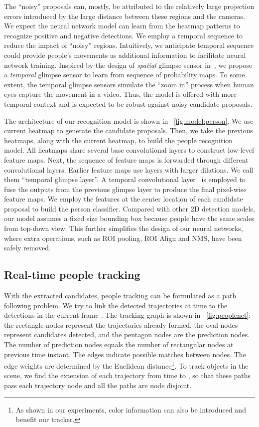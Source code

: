 \documentclass{article}
\begin{document}
The ``noisy'' proposals can, mostly, be attributed to the relatively large projection errors
introduced by the large distance between these regions and the cameras. We expect the neural network model can learn from the heatmap patterns to recognize positive and
negative detections.
We employ a temporal sequence to reduce the impact of ``noisy'' regions.
Intuitively, we anticipate temporal sequence could provide people's movements as additional information to facilitate neural network training.
Inspired by the design of \textit{spatial} glimpse sensor in~\cite{mnih2014recurrent}, we propose a \textit{temporal} glimpse sensor to learn from sequence of probability maps.
To some extent, the temporal glimpse sensors simulate the ``zoom in'' process when human eyes capture the movement in a video. Thus, the model is offered with
more temporal context and is expected to be robust against noisy candidate proposals.

The architecture of our recognition model is shown in \figurename~\ref{fig:model:person}. We use current heatmap  to generate the candidate proposals.
Then, we take the previous  heatmaps, along with the current heatmap, to build the people recognition model. All heatmaps share several base convolutional
layers to construct low-level feature maps. Next, the sequence of feature maps is forwarded through different convolutional layers.
Earlier feature maps use layers with larger dilations. We call them ``temporal glimpse layer''.
A temporal convolutional layer~\cite{bai2018empirical} is employed to fuse the outputs from the previous glimpse layer to produce the final pixel-wise feature maps.
We employ the features at the center location of each candidate proposal to build the person classifier. Compared with other 2D detection models,
our model assumes a fixed size bounding box because people have the same scales from top-down view. This further simplifies the design of our neural networks,
where extra operations, such as ROI pooling, ROI Align and NMS, have been safely removed.
\subsection{Real-time people tracking}
With the extracted candidates, people tracking can be formulated as a path following problem.
We try to link the detected trajectories at time  to the detections in the current frame .
The tracking graph is shown in \figurename{~\ref{fig:peoplenet}}: the rectangle nodes represent
the trajectories already formed, the oval nodes represent candidates detected, and the pentagon nodes are the prediction nodes. The number of prediction nodes
equals the number of rectangular nodes at previous time instant. 
The edges indicate possible matches between nodes.
The edge weights are determined by the Euclidean distance\footnote{As shown in our experiments, color information can also be introduced and benefit our tracker.}.
To track objects in the scene, we find the extension of each trajectory from time  to
, so that these paths pass each trajectory node and all the paths are node disjoint.
\end{document}
